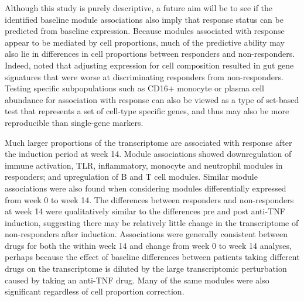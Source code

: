 Although this study is purely descriptive, a future aim will be to see if the identified baseline module associations also imply that response status can be predicted from baseline expression.
Because modules associated with response appear to be mediated by cell proportions,
much of the predictive ability may also lie in differences in cell proportions between responders and non-responders.
Indeed, \textcite{gaujoux2019CellcentredMetaanalysisReveals} noted that adjusting expression for cell composition resulted in gut gene signatures that were worse at discriminating responders from non-responders.
Testing specific subpopulations such as CD16+ monocyte or plasma cell abundance for association with response
can also be viewed as a type of set-based test that represents a set of cell-type specific genes,
and thus may also be more reproducible than single-gene markers.

Much larger proportions of the transcriptome are associated with response after the induction period at week 14.
Module associations
showed downregulation of immune activation, \gls{TLR}, inflammatory, monocyte and neutrophil modules in responders;
and upregulation of B and T cell modules.
Similar module associations were also found when considering modules differentially expressed from week 0 to week 14.
The differences between responders and non-responders at week 14 
were qualitatively similar to the differences pre and post anti-\gls{TNF} induction,
suggesting there may be relatively little change in the transcriptome of non-responders after induction.
Associations were generally consistent between drugs for both the within week 14 and change from week 0 to week 14 analyses,
perhaps because the effect of baseline differences between patients taking different drugs on the transcriptome is diluted
by the large transcriptomic perturbation caused by taking an anti-\gls{TNF} drug.
Many of the same modules were also significant regardless of cell proportion correction.

